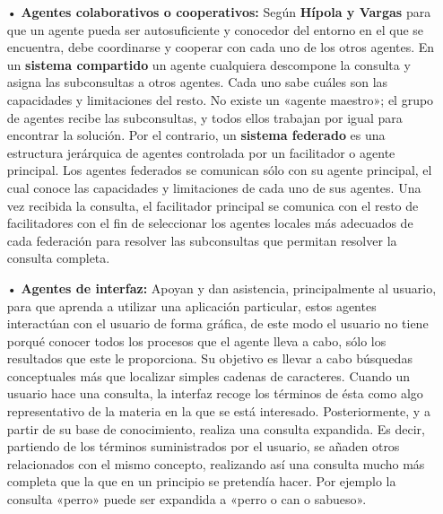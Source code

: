 \begin{itemize}
\item[•] {\bf Agentes colaborativos o cooperativos:} \vskip 0.1cm
Según {\bf Hípola y Vargas} para que un agente pueda ser autosuficiente y conocedor del entorno en el que se encuentra, debe coordinarse y cooperar con cada uno de los otros agentes. 
\vskip 0.1cm
En un {\bf sistema compartido} un agente cualquiera descompone la consulta y asigna las subconsultas a otros agentes. Cada uno sabe cuáles son las capacidades y limitaciones del resto. No existe un «agente maestro»; el grupo de agentes recibe las subconsultas, y todos ellos trabajan por igual para encontrar la solución.
\vskip 0.1cm
Por el contrario, un {\bf sistema federado} es una estructura jerárquica de agentes controlada por un facilitador o agente principal. Los agentes federados se comunican sólo con su agente principal, el cual conoce las capacidades y limitaciones de cada uno de sus agentes. Una vez recibida la consulta, el facilitador principal se comunica con el resto de facilitadores con el fin de seleccionar los agentes locales más adecuados de cada federación para resolver las subconsultas que permitan resolver la consulta completa.

\item[•] {\bf Agentes de interfaz:} \vskip 0.1cm
Apoyan y dan asistencia, principalmente al usuario, para que aprenda a utilizar una aplicación particular, estos agentes interactúan con el usuario de forma gráfica, de este modo el usuario no tiene porqué conocer todos los procesos que el agente lleva a cabo, sólo los resultados que este le proporciona. 
\vskip 0.1cm
Su objetivo es llevar a cabo búsquedas conceptuales más que localizar simples cadenas de caracteres. Cuando un usuario hace una consulta, la interfaz recoge los términos de ésta como algo representativo de la materia en la que se está interesado. Posteriormente, y a partir de su base de conocimiento, realiza una consulta expandida. Es decir, partiendo de los términos suministrados por el usuario, se añaden otros relacionados con el mismo concepto, realizando así una consulta mucho más completa que la que en un principio se pretendía hacer. Por ejemplo la consulta «perro» puede ser expandida a «perro o can o sabueso».


\end{itemize}
